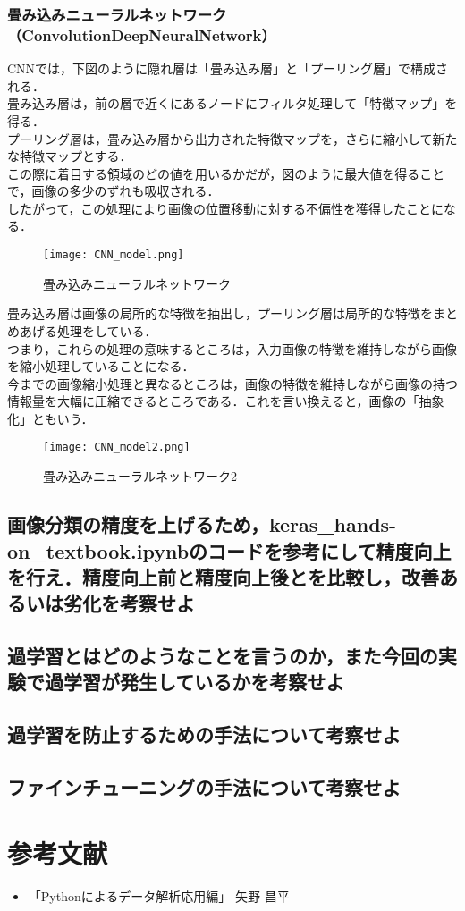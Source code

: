 \documentclass[uplatex,titlepage]{jsarticle}
\begin{document}
\subsubsection{畳み込みニューラルネットワーク（ConvolutionDeepNeuralNetwork）}
CNNでは，下図のように隠れ層は「畳み込み層」と「プーリング層」で構成される．\\
畳み込み層は，前の層で近くにあるノードにフィルタ処理して「特徴マップ」を得る．\\
プーリング層は，畳み込み層から出力された特徴マップを，さらに縮小して新たな特徴マップとする．\\
この際に着目する領域のどの値を用いるかだが，図のように最大値を得ることで，画像の多少のずれも吸収される．\\
したがって，この処理により画像の位置移動に対する不偏性を獲得したことになる．
\begin{figure}[H]%
    \begin{center}
    \texttt{[image: CNN\_model.png]} 
    \caption{畳み込みニューラルネットワーク}
    \end{center}
\end{figure}
畳み込み層は画像の局所的な特徴を抽出し，プーリング層は局所的な特徴をまとめあげる処理をしている．\\
つまり，これらの処理の意味するところは，入力画像の特徴を維持しながら画像を縮小処理していることになる．\\
今までの画像縮小処理と異なるところは，画像の特徴を維持しながら画像の持つ情報量を大幅に圧縮できるところである．これを言い換えると，画像の「抽象化」ともいう．

\begin{figure}[H]%
    \begin{center}
    \texttt{[image: CNN\_model2.png]} 
    \caption{畳み込みニューラルネットワーク2}
    \end{center}
\end{figure}

\subsection{画像分類の精度を上げるため，keras\_hands-on\_textbook.ipynbのコードを参考にして精度向上を行え．精度向上前と精度向上後とを比較し，改善あるいは劣化を考察せよ}


\subsection{過学習とはどのようなことを言うのか，また今回の実験で過学習が発生しているかを考察せよ}


\subsection{過学習を防止するための手法について考察せよ}


\subsection{ファインチューニングの手法について考察せよ}


\section{参考文献}
\begin{itemize}
  \item 「Pythonによるデータ解析応用編」-矢野 昌平
\end{itemize}
\end{document}
